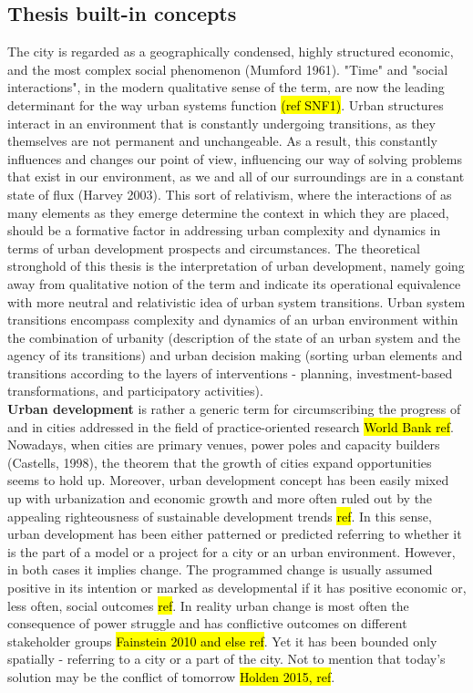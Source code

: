\documentclass[11pt]{report}
\begin{document}
\subsection{Thesis built-in concepts}
The city is regarded as a geographically condensed, highly structured economic, and the most complex social phenomenon (Mumford 1961). "Time" and "social interactions", in the modern qualitative sense of the term, are now the leading determinant for the way urban systems function \hl{(ref SNF1)}. Urban structures interact in an environment that is constantly undergoing transitions, as they themselves are not permanent and unchangeable. As a result, this constantly influences and changes our point of view, influencing our way of solving problems that exist in our environment, as we and all of our surroundings are in a constant state of flux (Harvey 2003). This sort of relativism, where the interactions of as many elements as they emerge determine the context in which they are placed, should be a formative factor in addressing urban complexity and dynamics in terms of urban development prospects and circumstances. The theoretical stronghold of this thesis is the interpretation of urban development, namely going away from qualitative notion of the term and indicate its operational equivalence with more neutral and relativistic idea of urban system transitions. Urban system transitions encompass complexity and dynamics of an urban environment within the combination of urbanity (description of the state of an urban system and the agency of its transitions) and urban decision making (sorting urban elements and transitions according to the layers of interventions - planning, investment-based transformations, and participatory activities).
\\ 
\textbf{Urban development} is rather a generic term for circumscribing the progress of and in cities addressed in the  field of practice-oriented research \hl{World Bank ref}. Nowadays, when cities are primary venues, power poles and capacity builders (Castells, 1998), the theorem that the growth of cities expand opportunities seems to hold up. Moreover, urban development concept has been easily mixed up with urbanization and economic growth and more often ruled out by the appealing righteousness of sustainable development trends \hl{ref}.  In this sense, urban development has been either patterned or predicted referring to whether it is the part of a model or a project for a city or an urban environment. However, in both cases it implies change. The programmed change is usually assumed positive in its intention or marked as developmental if it has positive economic or, less often, social outcomes \hl{ref}. In reality urban change is most often the consequence of power struggle and has conflictive outcomes on different stakeholder groups \hl{Fainstein 2010 and else ref}. Yet it has been bounded only spatially - referring to a city or a part of the city. Not to mention that today's solution may be the conflict of tomorrow \hl{Holden 2015, ref}.
\end{document}
